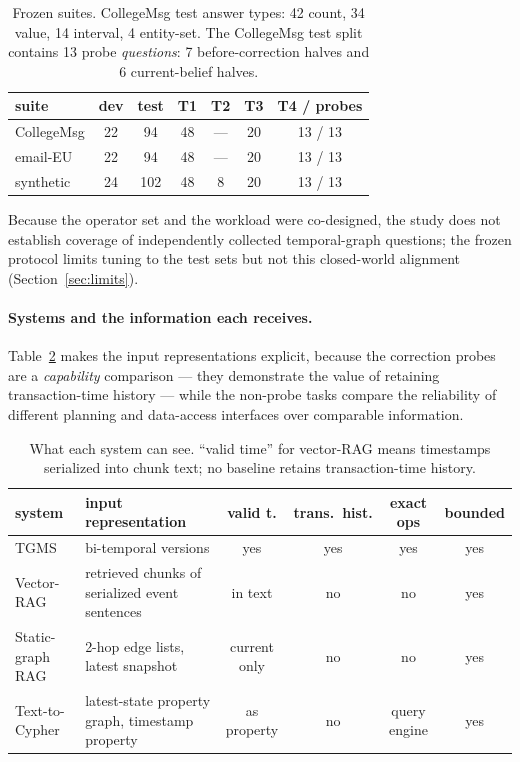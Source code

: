 \documentclass[11pt]{article}
\begin{document}
\begin{table}[t]
\centering\small
\caption{Frozen suites. CollegeMsg test answer types: 42 count,
34 value, 14 interval, 4 entity-set. The CollegeMsg test split
contains 13 probe \emph{questions}: 7 before-correction halves and 6
current-belief halves.}
\label{tab:data}
\begin{tabular}{lcccccc}
\toprule
suite & dev & test & T1 & T2 & T3 & T4 / probes \\
\midrule
CollegeMsg & 22 & 94 & 48 & --- & 20 & 13 / 13 \\
email-EU & 22 & 94 & 48 & --- & 20 & 13 / 13 \\
synthetic & 24 & 102 & 48 & 8 & 20 & 13 / 13 \\
\bottomrule
\end{tabular}
\end{table}

Because the operator set and the workload were co-designed, the study
does not establish coverage of independently collected temporal-graph
questions; the frozen protocol limits tuning to the test sets but not
this closed-world alignment (Section~\ref{sec:limits}).

\paragraph{Systems and the information each receives.}
Table~\ref{tab:baselineinfo} makes the input representations explicit,
because the correction probes are a \emph{capability} comparison ---
they demonstrate the value of retaining transaction-time history ---
while the non-probe tasks compare the reliability of different planning
and data-access interfaces over comparable information.

\begin{table}[t]
\centering\small
\caption{What each system can see. ``valid time'' for vector-RAG means
timestamps serialized into chunk text; no baseline retains
transaction-time history.}
\label{tab:baselineinfo}
\begin{tabular}{lp{3.6cm}cccc}
\toprule
system & input representation & valid t. & trans.\ hist. & exact ops & bounded \\
\midrule
TGMS & bi-temporal versions & yes & yes & yes & yes \\
Vector-RAG & retrieved chunks of serialized event sentences & in text & no & no & yes \\
Static-graph RAG & 2-hop edge lists, latest snapshot & current only & no & no & yes \\
Text-to-Cypher & latest-state property graph, timestamp property & as property & no & query engine & yes \\
\bottomrule
\end{tabular}
\end{table}
\end{document}
